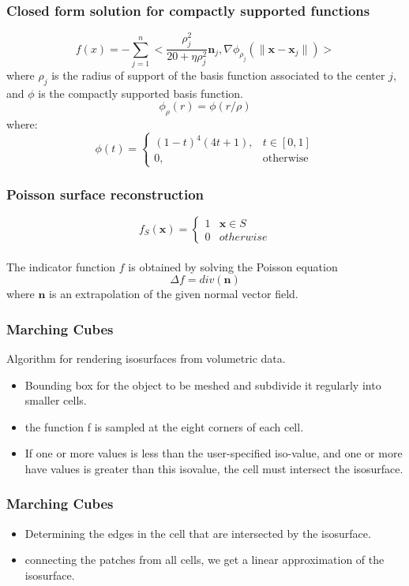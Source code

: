 \documentclass{beamer}
\def\x{\mathbf{x}}
\def\n{\mathbf{n}}
\begin{document}
\begin{frame}
\frametitle{Closed form solution for compactly supported functions}
\Large
\begin{equation} \label{hrbfclosed}
f(x)=-\sum_{j=1}^n<\frac{\rho^2_j}{20+\eta\rho^2_j} \n_j, \nabla\phi_{\rho_j}(\|\x-\x_j\|)>
\end{equation}
where $\rho_j$ is the radius of support of the basis function associated to the center $j$, 
and $\phi$ is the compactly supported basis function. 
\[
\phi_{\rho}(r)=\phi(r/\rho)
\]
where:
\[
\phi (t)= \left\{ \begin{array}{ll} (1-t)^{4}(4t+1), & t \in [0,1]\\ 
0, & \text{otherwise} \end{array}\right.
\]

\end{frame}

\begin{frame}
	\frametitle{Poisson surface reconstruction}
\[
f_S (\x)= \left\{ \begin{array}{ll} 1 & \x \in S\\ 
0 & otherwise \end{array}\right.
\]\\
The indicator function
$f$ is obtained by solving the Poisson equation
\[
\Delta f=div(\n)
\]
where $\n$ is an extrapolation of the given normal vector field.
\end{frame}


\begin{frame}
\frametitle{Marching Cubes}
\Large
Algorithm for rendering isosurfaces from volumetric data. \\
\begin{itemize}
\item Bounding box for the object to be meshed and subdivide it regularly into smaller cells. 
\item the function f is sampled at the eight corners of each cell.
\item If one or more values is less than the user-specified iso-value, and one or more have values is greater than this isovalue, the cell must intersect the isosurface.
\end{itemize}
\end{frame}


\begin{frame}
\frametitle{Marching Cubes}
\Large
\begin{itemize}
\item Determining the edges in the cell that are intersected by the isosurface.
\item connecting the patches from all cells, we get a linear approximation of the isosurface.
\end{itemize}
\end{frame}
\end{document}
